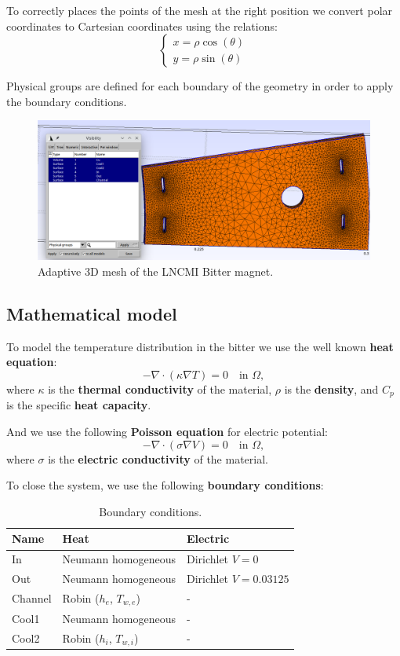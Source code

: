 \documentclass[12pt]{article}
\begin{document}
To correctly places the points of the mesh at the right position we convert polar
coordinates to Cartesian coordinates using the relations:
$$
\begin{cases}
  x = \rho \cos(\theta) \\
  y = \rho \sin(\theta)
\end{cases}
$$

Physical groups are defined for each boundary of the geometry in order to apply the boundary conditions.

\begin{figure}[H]
  \centering
  \includegraphics[width=\textwidth]{images/bitter_mesh.png}
  \caption{Adaptive 3D mesh of the LNCMI Bitter magnet.}
\end{figure}

\subsection{Mathematical model}
To model the temperature distribution in the bitter we use the well known \textbf{heat equation}:
$$
-\nabla \cdot (\kappa \nabla T) = 0 \quad \text{in } \Omega,
$$
where $\kappa$ is the \textbf{thermal conductivity} of the material, $\rho$ is
the \textbf{density}, and $C_p$ is the specific \textbf{heat capacity}.

\noindent And we use the following \textbf{Poisson equation} for electric potential:
$$
- \nabla \cdot (\sigma \nabla V) = 0 \quad \text{in } \Omega,
$$
where $\sigma$ is the \textbf{electric conductivity} of the material.

To close the system, we use the following \textbf{boundary conditions}:

\begin{table}[H]
  \centering
  \begin{tabular}{|l|l|l|}
    \hline
    \textbf{Name} & \textbf{Heat} & \textbf{Electric} \\ \hline
    In & Neumann homogeneous & Dirichlet $V = 0$ \\ \hline
    Out & Neumann homogeneous & Dirichlet $V = 0.03125$ \\ \hline
    Channel & Robin ($h_e$, $T_{w,e}$) & - \\ \hline
    Cool1 & Neumann homogeneous & - \\ \hline
    Cool2 & Robin ($h_i$, $T_{w,i}$) & - \\ \hline
  \end{tabular}
  \caption{Boundary conditions.}
  \label{tab:boundary_conditions}
\end{table}
\end{document}
